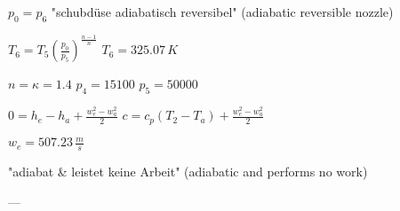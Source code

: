 \( p_0 = p_6 \)  
"schubdüse adiabatisch reversibel" (adiabatic reversible nozzle)  

\( T_6 = T_5 \left( \frac{p_0}{p_5} \right)^{\frac{n-1}{n}} \)  
\( T_6 = 325.07 \, K \)  

\( n = \kappa = 1.4 \)  
\( p_4 = 15100 \)  
\( p_5 = 50000 \)  

\( 0 = h_e - h_a + \frac{w_e^2 - w_a^2}{2} \)  
\( c = c_p (T_2 - T_a) + \frac{w_e^2 - w_a^2}{2} \)  

\( w_e = 507.23 \, \frac{m}{s} \)  

"adiabat & leistet keine Arbeit" (adiabatic and performs no work)  

---